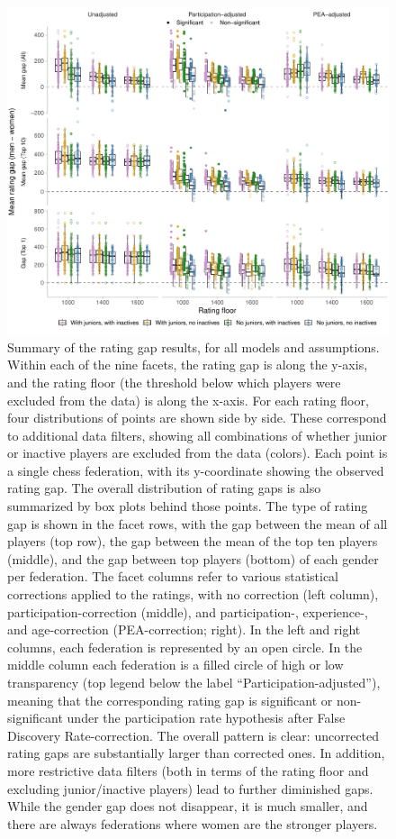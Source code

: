 \documentclass[9pt,twocolumn,twoside,lineno]{pnas-new}
\begin{document}
\begin{figure}[!ht]
  \centering
  \includegraphics[width=\linewidth]{fig_4.pdf}
  \caption{Summary of the rating gap results, for all models and assumptions. Within each of the nine facets, the rating gap is along the y-axis, and the rating floor (the threshold below which players were excluded from the data) is along the x-axis. For each rating floor, four distributions of points are shown side by side. These correspond to additional data filters, showing all combinations of whether junior or inactive players are excluded from the data (colors). Each point is a single chess federation, with its y-coordinate showing the observed rating gap. The overall distribution of rating gaps is also summarized by box plots behind those points. The type of rating gap is shown in the facet rows, with the gap between the mean of all players (top row), the gap between the mean of the top ten players (middle), and the gap between top players (bottom) of each gender per federation. The facet columns refer to various statistical corrections applied to the ratings, with no correction (left column), participation-correction (middle), and participation-, experience-, and age-correction (PEA-correction; right). In the left and right columns, each federation is represented by an open circle. In the middle column each federation is a filled circle of high or low transparency (top legend below the label ``Participation-adjusted''), meaning that the corresponding rating gap is significant or non-significant under the participation rate hypothesis after False Discovery Rate-correction. The overall pattern is clear: uncorrected rating gaps are substantially larger than corrected ones. In addition, more restrictive data filters (both in terms of the rating floor and excluding junior/inactive players) lead to further diminished gaps. While the gender gap does not disappear, it is much smaller, and there are always federations where women are the stronger players.}
\end{figure}
\end{document}
